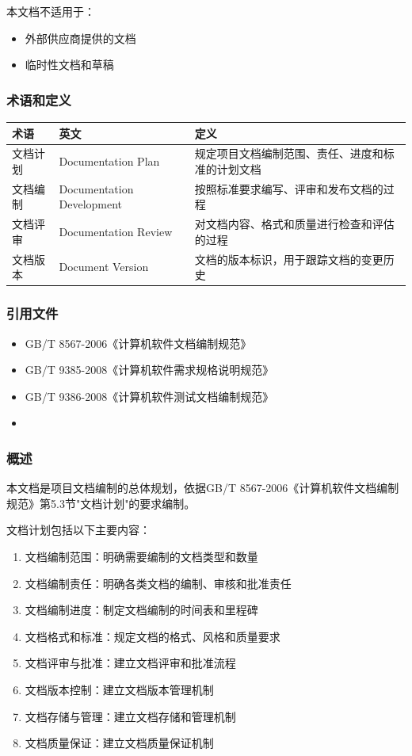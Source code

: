 \documentclass[12pt,a4paper]{article}
\numberwithin{equation}{section}  %
\begin{document}
本文档不适用于：
\begin{itemize}
\item 外部供应商提供的文档
\item 临时性文档和草稿
\end{itemize}

\subsubsection{术语和定义}
\begin{longtable}{|p{4cm}|p{5cm}|p{5cm}|}
\hline
术语 & 英文 & 定义 \\
\hline
文档计划 & Documentation Plan & 规定项目文档编制范围、责任、进度和标准的计划文档 \\
文档编制 & Documentation Development & 按照标准要求编写、评审和发布文档的过程 \\
文档评审 & Documentation Review & 对文档内容、格式和质量进行检查和评估的过程 \\
文档版本 & Document Version & 文档的版本标识，用于跟踪文档的变更历史 \\
\hline
\end{longtable}

\subsubsection{引用文件}
\begin{itemize}
\item GB/T 8567-2006《计算机软件文档编制规范》
\item GB/T 9385-2008《计算机软件需求规格说明规范》
\item GB/T 9386-2008《计算机软件测试文档编制规范》
\item [其他相关标准或文件]
\end{itemize}

\subsubsection{概述}
本文档是项目文档编制的总体规划，依据GB/T 8567-2006《计算机软件文档编制规范》第5.3节"文档计划"的要求编制。

文档计划包括以下主要内容：
\begin{enumerate}
\item 文档编制范围：明确需要编制的文档类型和数量
\item 文档编制责任：明确各类文档的编制、审核和批准责任
\item 文档编制进度：制定文档编制的时间表和里程碑
\item 文档格式和标准：规定文档的格式、风格和质量要求
\item 文档评审与批准：建立文档评审和批准流程
\item 文档版本控制：建立文档版本管理机制
\item 文档存储与管理：建立文档存储和管理机制
\item 文档质量保证：建立文档质量保证机制
\end{enumerate}
\end{document}
